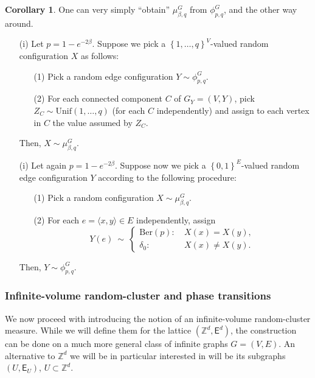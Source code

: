 \documentclass[12pt]{article}
\newcommand{\E}{\mathsf{E}}
\newcommand{\Z}{\mathbb{Z}}
\newcommand{\set}[1]{\left\{#1\right\}}
\newcommand{\1}{\mathbbm{1}}
\renewcommand{\sp}[1]{\langle #1\rangle}
\newcommand{\5}{\vspace{0.5cm}}
\theoremstyle{definition}
\newtheorem{cor}[thm]{Corollary}
\begin{document}
\begin{cor}\label{cor:EdwardsSokal}
One can very simply ``obtain'' $\mu_{\beta,q}^G$ from $\phi_{p,q}^G$, and the other way around.
\begin{itemize}
	\item[(i)] Let $p=1-e^{-2\beta}$. Suppose we pick a $\set{1,\ldots,q}^V$-valued random configuration $X$ as follows:
	\begin{itemize}
		\item[(1)] Pick a random edge configuration $Y\sim\phi_{p,q}^G$.
		\item[(2)]  For each connected component $C$ of $G_Y=(V,Y)$, pick $Z_C\sim\mathrm{Unif}(1,\ldots,q)$ (for each $C$ independently) and assign to each vertex in $C$ the value assumed by $Z_C$.
	\end{itemize}
	Then, $X\sim\mu_{\beta,q}^G$.
	\item[(i)] Let again $p=1-e^{-2\beta}$. Suppose now we pick a $\set{0,1}^E$-valued random edge configuration $Y$ according to the following procedure:
	\begin{itemize}
		\item[(1)] Pick a random configuration $X\sim\mu_{\beta,q}^G$.
		\item[(2)] For each $e=\sp{x,y}\in E$ independently, assign
		$$Y(e) ~\sim~ \begin{cases}
		\mathrm{Ber}(p): ~&X(x)=X(y),\\
		\delta_0: ~&X(x)\neq X(y).
		\end{cases}$$
	\end{itemize}
	Then, $Y\sim\phi_{p,q}^G$.
\end{itemize}
\end{cor}


\subsubsection{Infinite-volume random-cluster and phase transitions}\label{subsec:RCinf}

We now proceed with introducing the notion of an infinite-volume random-cluster measure. While we will define them for the lattice $(\Z^d,\E^d)$, the construction can be done on a much more general class of infinite graphs $G=(V,E)$. An alternative to $\Z^d$ we will be in particular interested in will be its subgraphs $(U,\E_U)$, $U\subset\Z^d$. \\
\end{document}
